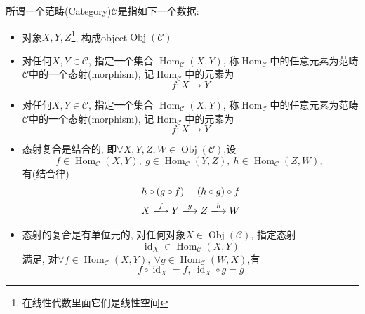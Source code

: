 
\begin{definition}
    所谓一个范畴(Category)$\mathcal{C}$是指如下一个数据:
    \begin{itemize}
        \item 对象$X,Y,Z$\footnote{在线性代数里面它们是线性空间}, 构成object$\operatorname{Obj}(\mathcal{C})$
        
        \item 对任何$X,Y \in \mathcal{C}$, 指定一个集合 $\operatorname{Hom}_{\mathcal{C}}(X,Y)$, 称$\operatorname{Hom}_{\mathcal{C}}$中的任意元素为范畴$\mathcal{C}$中的一个态射(morphism), 记$\operatorname{Hom}_{\mathcal{C}}$中的元素为
        \begin{equation}
          f\colon X\rightarrow Y
        \end{equation}

        \item 对任何$X,Y \in \mathcal{C}$, 指定一个集合 $\operatorname{Hom}_{\mathcal{C}}(X,Y)$, 称$\operatorname{Hom}_{\mathcal{C}}$中的任意元素为范畴$\mathcal{C}$中的一个态射(morphism), 记$\operatorname{Hom}_{\mathcal{C}}$中的元素为
        \begin{equation}
          f\colon X\rightarrow Y
        \end{equation}

        \item 态射复合是结合的, 即$\forall X,Y,Z,W \in \operatorname{Obj}(\mathcal{C})$,设
        \begin{equation}
          f \in \operatorname{Hom}_{\mathcal{C}}(X,Y), \ 
          g \in \operatorname{Hom}_{\mathcal{C}}(Y,Z), \ 
          h \in \operatorname{Hom}_{\mathcal{C}}(Z,W), \ 
        \end{equation}
        有(结合律)
        \begin{gather}
            h \circ (g \circ f) = (h\circ g) \circ f
            \\
            X \xlongrightarrow{f} Y \xlongrightarrow{g} Z \xlongrightarrow{h} W
        \end{gather}

        \item 态射的复合是有单位元的, 对任何对象$X \in \operatorname{Obj} (\mathcal{C})$, 指定态射
        \begin{equation}
          \operatorname{id}_{X} \in \operatorname{Hom}_{\mathcal{C}}(X,Y)
        \end{equation}
        满足, 对$\forall f \in \operatorname{Hom}_{\mathcal{C}} (X,Y) , \ \forall g \in \operatorname{Hom}_{\mathcal{C}}(W,X)$,有
        \begin{equation}
          f \circ \operatorname{id}_{X} = f , \ 
          \operatorname{id}_{X} \circ g = g
        \end{equation}
    \end{itemize}
\end{definition}

